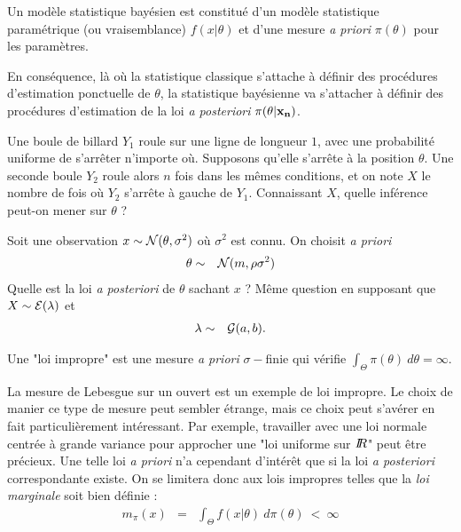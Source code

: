\begin{definition}
 Un modèle statistique bayésien est constitué d'un {modèle statistique paramétrique (ou vraisemblance) $f(x|\theta)$} et d'une {mesure {\it a priori} $\pi(\theta)$}  pour les paramètres.
\end{definition}

En conséquence, là où la statistique classique s'attache à définir des procédures d'estimation ponctuelle de $\theta$, la statistique bayésienne va s'attacher à définir des procédures d'estimation de la loi {\it a posteriori} $\pi(\theta|{\bf x_n})$.  

\begin{exec}[Bayes (1763)]\label{exo2}
Une boule de billard $Y_1$ roule sur une ligne de longueur $1$, avec une probabilité uniforme de s'arr\^eter n'importe où. Supposons qu'elle s'arr\^ete à la position $\theta$. Une seconde boule $Y_2$ roule alors $n$ fois dans les m\^emes conditions, et on note $X$ le nombre de fois où $Y_2$ s'arr\^ete à gauche de $Y_1$. Connaissant $X$, quelle inférence peut-on mener sur $\theta$ ?
\end{exec}
\if{} 
\fi

\begin{exec}\label{exo3}
Soit une observation $x\sim{\cal{N}}(\theta,\sigma^2)$ où $\sigma^2$ est connu. On choisit {\it a priori}
\begin{eqnarray*}
\theta & \sim & {\cal{N}}(m,\rho\sigma^2)
\end{eqnarray*} 
Quelle est la loi {\it a posteriori} de $\theta$ sachant $x$ ? Même question en supposant que $X\sim {\cal{E}}(\lambda)$ et
\begin{eqnarray*}
\lambda & \sim & {\cal{G}}(a,b).
\end{eqnarray*}
\end{exec}

\begin{definition}\label{def.loi.impropre}
 Une "loi impropre" est une mesure {\it a priori} $\sigma-$finie qui vérifie $\int_{\Theta} \pi(\theta) \ d\theta = \infty$.
\end{definition}

La mesure de Lebesgue sur un ouvert est un exemple de loi impropre. Le choix de manier ce type de mesure peut sembler étrange, mais ce choix peut s'avérer en fait particulièrement intéressant. Par exemple, travailler avec une loi normale centrée à grande variance pour approcher une "loi uniforme sur $I\!\!R$" peut être précieux. Une telle loi {\it a priori } n'a cependant d'intérêt que si la loi {\it a posteriori} correspondante existe. On se limitera donc aux lois impropres telles que la \emph{loi marginale} soit bien définie :
\begin{eqnarray*}
m_{\pi}(x) & = & \int_{\Theta} f(x|\theta) \ d\pi(\theta) \ < \ \infty
\end{eqnarray*}

